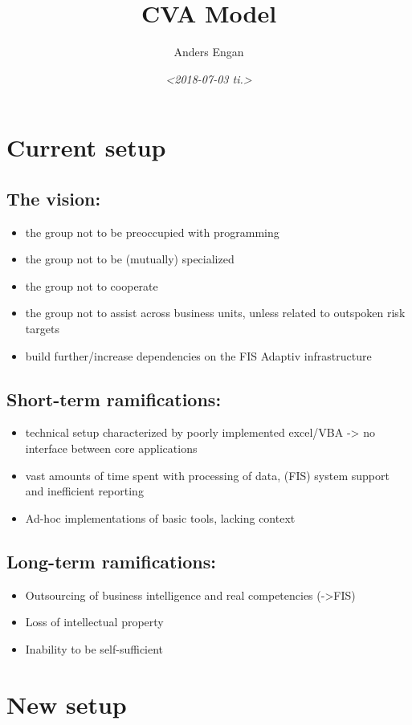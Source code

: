\documentclass[11pt]{article}
\author{Anders Engan}
\date{\textit{<2018-07-03 ti.>}}
\title{CVA Model}
\begin{document}
\maketitle
\tableofcontents


\section{Current setup}
\label{sec:org501e401}
\subsection{The vision:}
\label{sec:org92a2855}
\begin{itemize}
\item the group not to be preoccupied with programming
\item the group not to be (mutually) specialized
\item the group not to cooperate
\item the group not to assist across business units, unless related to outspoken risk targets
\item build further/increase dependencies on the FIS Adaptiv infrastructure
\end{itemize}
\subsection{Short-term ramifications:}
\label{sec:orga22ee91}
\begin{itemize}
\item technical setup characterized by poorly implemented excel/VBA -> no interface between core applications
\item vast amounts of time spent with processing of data, (FIS) system support and inefficient reporting
\item Ad-hoc implementations of basic tools, lacking context
\end{itemize}
\subsection{Long-term ramifications:}
\label{sec:orgb94cfe2}
\begin{itemize}
\item Outsourcing of business intelligence and real competencies (->FIS)
\item Loss of intellectual property
\item Inability to be self-sufficient
\end{itemize}
\section{New setup}
\label{sec:orgca3ec1f}
\end{document}
